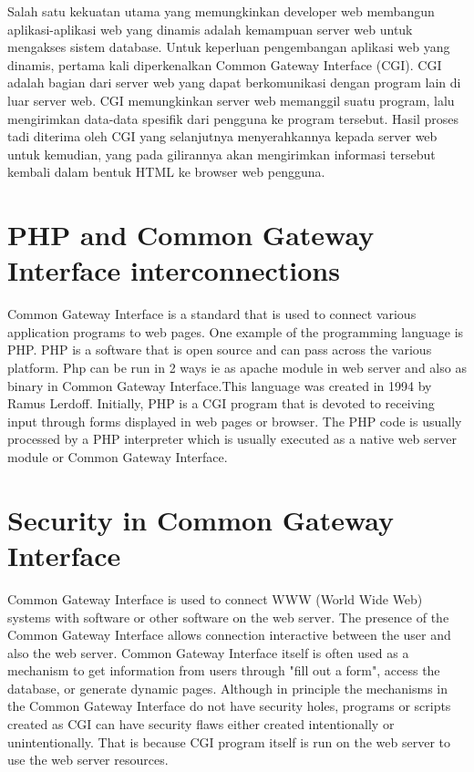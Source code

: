 \par Salah satu kekuatan utama yang memungkinkan developer web membangun aplikasi-aplikasi web yang dinamis adalah kemampuan server web untuk mengakses sistem database. Untuk keperluan pengembangan aplikasi web yang dinamis, pertama kali diperkenalkan Common Gateway Interface (CGI). CGI adalah bagian dari server web yang dapat berkomunikasi dengan program lain di luar server web. CGI memungkinkan server web memanggil suatu program, lalu mengirimkan data-data spesifik dari pengguna ke program tersebut. Hasil proses tadi diterima oleh CGI yang selanjutnya menyerahkannya kepada server web untuk kemudian, yang pada gilirannya akan mengirimkan informasi tersebut kembali dalam bentuk HTML ke browser web pengguna\cite{ibrahim2011sistem}.

\section{PHP and Common Gateway Interface interconnections }
Common Gateway Interface is a standard that is used to connect various application programs to web pages. One example of the programming language is PHP. PHP is a software that is open source and can pass across the various platform. Php can be run in 2 ways ie as apache module in web server and also as binary in Common Gateway Interface.This language was created in 1994 by Ramus Lerdoff.  Initially, PHP is a CGI program that is devoted to receiving input through forms displayed in web pages or browser. The PHP code is usually processed by a PHP interpreter which is usually executed as a native web server module or Common Gateway Interface\cite{nahado2015bumbu}.


\section{Security in Common Gateway Interface }
Common Gateway Interface is used to connect WWW (World Wide Web) systems with software or other software on the web server. The presence of the Common Gateway Interface allows connection interactive between the user and also the web server. Common Gateway Interface itself is often used as a mechanism to get information from users through "fill out a form", access the database, or generate dynamic pages. Although in principle the mechanisms in the Common Gateway Interface do not have security holes, programs or scripts created as CGI can have security flaws either created intentionally or unintentionally. That is because CGI program itself is run on the web server to use the web server resources.

